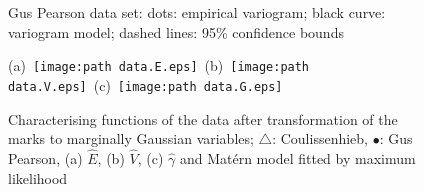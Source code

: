 \documentclass[10pt]{article}
\begin{document}
\def\FigOne#1{Gus Pearson data set: dots: empirical variogram; black curve:
 variogram model; dashed lines: 95\% confidence bounds \label{fig:#1}}
\begin{figure}
 \hfil {}\hfill 
 \caption{\FigOne{confidence}}
\end{figure}

\def\FigO#1{ Characterising functions of the
 data after transformation of the marks to marginally
 Gaussian variables;
 $\bigtriangleup$: Coulissenhieb, $\bullet$: Gus Pearson, 
 (a) $\hat E$, (b) $\hat V$, (c) $\hat \gamma$ and Mat\'ern model
 fitted by maximum likelihood
 \label{fig:#1}}
\begin{figure}
  \hbox{(a) \texttt{[image: \\path data.E.eps]} 
    (b) \texttt{[image: \\path data.V.eps]}
    (c) \texttt{[image: \\path data.G.eps]}}
  \caption{\FigO{data.EVG}}
\end{figure}

\clearpage
\end{document}
